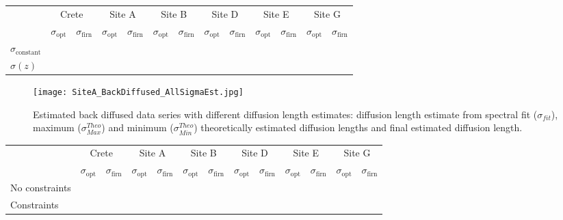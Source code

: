 \documentclass[../../CompleteThesis/Complete_1stDraft]{subfiles}
\begin{document}
\begin{table}[ht]
	\centering
	\begin{tabular}{l||*{6}{c | c||}}
		&
		\multicolumn{2}{c}{Crete} & \multicolumn{2}{c}{Site A} & \multicolumn{2}{c}{Site B} & \multicolumn{2}{c}{Site D} & \multicolumn{2}{c}{Site E} & \multicolumn{2}{c||}{Site G} \\
		&
		$\sigma_{\text{opt}}$ & $\sigma_{\text{firn}}$ & $\sigma_{\text{opt}}$ & $\sigma_{\text{firn}}$ & $\sigma_{\text{opt}}$ & $\sigma_{\text{firn}}$ & $\sigma_{\text{opt}}$ & $\sigma_{\text{firn}}$ & $\sigma_{\text{opt}}$ & $\sigma_{\text{firn}}$ & $\sigma_{\text{opt}}$ & $\sigma_{\text{firn}}$ \\
		
		\hline
		$\sigma_{\text{constant}}$ & & & & & & & & & & & & \\ 
		$\sigma(z)$ & & & & & & & & & & & & \\ 
	\end{tabular}
\end{table}

\begin{figure}
	\centering
	\texttt{[image: SiteA\_BackDiffused\_AllSigmaEst.jpg]}
	\caption[All diffusion length estimate deconvolutions, Site A]{Estimated back diffused data series with different diffusion length estimates: diffusion length estimate from spectral fit ($\sigma_{fit}$), maximum ($\sigma_{Max}^{Theo}$) and minimum ($\sigma_{Min}^{Theo}$) theoretically estimated diffusion lengths and final estimated diffusion length.}
	\label{fig:SiteA_BackDiffused_AllSigmaEst}
\end{figure}

\begin{table}[ht]
	\centering
	\begin{tabular}{l||*{6}{c | c||}}
		&
		\multicolumn{2}{c}{Crete} & \multicolumn{2}{c}{Site A} & \multicolumn{2}{c}{Site B} & \multicolumn{2}{c}{Site D} & \multicolumn{2}{c}{Site E} & \multicolumn{2}{c||}{Site G} \\
		&
		$\sigma_{\text{opt}}$ & $\sigma_{\text{firn}}$ & $\sigma_{\text{opt}}$ & $\sigma_{\text{firn}}$ & $\sigma_{\text{opt}}$ & $\sigma_{\text{firn}}$ & $\sigma_{\text{opt}}$ & $\sigma_{\text{firn}}$ & $\sigma_{\text{opt}}$ & $\sigma_{\text{firn}}$ & $\sigma_{\text{opt}}$ & $\sigma_{\text{firn}}$ \\
		
		\hline
 		No constraints & & & & & & & & & & & & \\ 
		Constraints & & & & & & & & & & & & \\ 
	\end{tabular}
\end{table}
\end{document}
